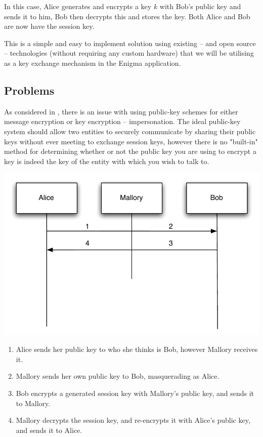 In this case, Alice generates and encrypts a key $k$ with Bob's public key and sends it to him, Bob then decrypts this and stores the key. Both Alice and Bob are now have the session key.

This is a simple and easy to implement solution using existing -- and open source -- technologies (without requiring any custom hardware) that we will be utilising as a key exchange mechanism in the Enigma application.

\subsection{Problems}

As considered in \emph{}, there is an issue with using public-key schemes for either message encryption or key encryption -- impersonation. The ideal public-key system should allow two entities to securely communicate by sharing their public keys without ever meeting to exchange session keys, however there is no "built-in" method for determining whether or not the public key you are using to encrypt a key is indeed the key of the entity with which you wish to talk to. 

\begin{center}
  \includegraphics[scale=0.6]{./Figures/3-7-1.pdf}
\end{center}

\begin{enumerate}
  \item Alice sends her public key to who she thinks is Bob, however Mallory receives it.
  \item Mallory sends her own public key to Bob, masquerading as Alice.
  \item Bob encrypts a generated session key with Mallory's public key, and sends it to Mallory.
  \item Mallory decrypts the session key, and re-encrypts it with Alice's public key, and sends it to Alice.
\end{enumerate}

